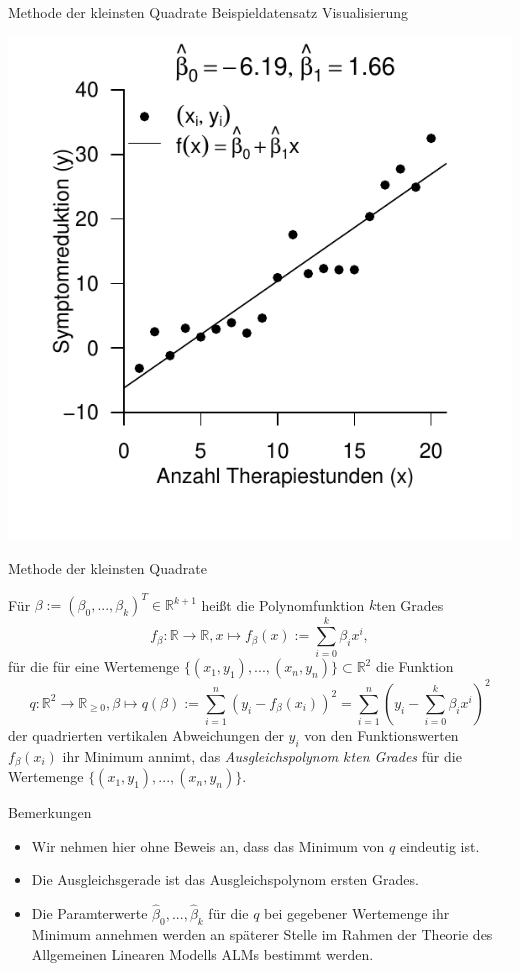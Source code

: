 \documentclass[
  8pt,
  ignorenonframetext,
]{beamer}
\providecommand{\tightlist}{%
  \setlength{\itemsep}{0pt}\setlength{\parskip}{0pt}}
\begin{document}
\begin{frame}{Methode der kleinsten Quadrate}
\protect\hypertarget{methode-der-kleinsten-quadrate-16}{}
Beispieldatensatz Visualisierung \vspace{5mm}

\begin{center}\includegraphics[width=0.55\linewidth]{1_Abbildungen/alm_1_ausgleichsgerade_3} \end{center}
\end{frame}

\begin{frame}{Methode der kleinsten Quadrate}
\protect\hypertarget{methode-der-kleinsten-quadrate-17}{}
\footnotesize
\begin{definition}[Ausgleichspolynom]
\justifying
Für $\beta := (\beta_0,...,\beta_k)^T \in \mathbb{R}^{k+1}$ heißt die Polynomfunktion $k$ten Grades
\begin{equation}
f_\beta : \mathbb{R} \to \mathbb{R}, x \mapsto f_\beta(x) := \sum_{i=0}^k \beta_i x^i,
\end{equation}
für die für eine Wertemenge  $\{(x_1,y_1),...,(x_n,y_n)\} \subset \mathbb{R}^2$ die Funktion
\begin{equation}
q : \mathbb{R}^2 \to \mathbb{R}_{\ge 0}, \beta \mapsto q(\beta)
:= \sum_{i=1}^n \left(y_i-f_\beta(x_i)\right)^2
 = \sum_{i=1}^n \left(y_i- \sum_{i=0}^k \beta_i x^i\right)^2
\end{equation}
der quadrierten vertikalen Abweichungen der $y_i$ von den Funktionswerten
$f_{\beta}(x_i)$ ihr Minimum annimt, das \textit{Ausgleichspolynom $k$ten Grades}
für die Wertemenge $\{(x_1,y_1),...,(x_n,y_n)\}$.
\end{definition}

\footnotesize

Bemerkungen

\begin{itemize}
\tightlist
\item
  Wir nehmen hier ohne Beweis an, dass das Minimum von \(q\) eindeutig
  ist.
\item
  Die Ausgleichsgerade ist das Ausgleichspolynom ersten Grades.
\item
  Die Paramterwerte \(\hat{\beta}_0,...,\hat{\beta}_k\) für die \(q\)
  bei gegebener Wertemenge ihr Minimum annehmen werden an späterer
  Stelle im Rahmen der Theorie des Allgemeinen Linearen Modells ALMs
  bestimmt werden.
\end{itemize}
\end{frame}
\end{document}
